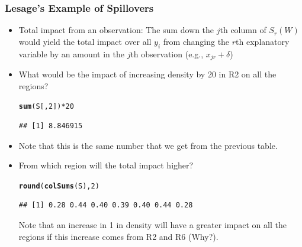 \documentclass[english,10pt]{beamer}\usepackage[]{graphicx}\usepackage[]{xcolor}
\makeatletter
\newcommand{\hlnum}[1]{\textcolor[rgb]{0.686,0.059,0.569}{#1}}%
\newcommand{\hlopt}[1]{\textcolor[rgb]{0,0,0}{#1}}%
\newcommand{\hldef}[1]{\textcolor[rgb]{0.345,0.345,0.345}{#1}}%
\newcommand{\hlkwd}[1]{\textcolor[rgb]{0.737,0.353,0.396}{\textbf{#1}}}%
\newenvironment{kframe}{%
 \def\at@end@of@kframe{}%
 \ifinner\ifhmode%
  \def\at@end@of@kframe{\end{minipage}}%
  \begin{minipage}{\columnwidth}%
 \fi\fi%
 \def\FrameCommand##1{\hskip\@totalleftmargin \hskip-\fboxsep
 \colorbox{shadecolor}{##1}\hskip-\fboxsep
     \hskip-\linewidth \hskip-\@totalleftmargin \hskip\columnwidth}%
 \MakeFramed {\advance\hsize-\width
   \@totalleftmargin\z@ \linewidth\hsize
   \@setminipage}}%
 {\par\unskip\endMakeFramed%
 \at@end@of@kframe}
\newenvironment{knitrout}{}{} %
\makeatother
\begin{document}
\begin{frame}[fragile]
  \frametitle{Lesage's Example of Spillovers}
    \begin{itemize}
      \item \alert{Total impact from an observation}: The sum down the $j$th column of $S_r(W)$ would yield the total impact over all $y_i$ from changing the $r$th explanatory variable by an amount in the $j$th observation (e.g., $x_{jr} + \delta$)
      \item What would be the impact of increasing density by 20 in R2 on all the regions?
\begin{knitrout}
\color{fgcolor}\begin{kframe}
\begin{alltt}
 \hlkwd{sum}\hldef{(S[,} \hlnum{2}\hldef{])} \hlopt{*} \hlnum{20}
\end{alltt}
\begin{verbatim}
## [1] 8.846915
\end{verbatim}
\end{kframe}
\end{knitrout}
   
   \item Note that this is the same number that we get from the previous table.
   \item From which region will the total impact higher?
   
\begin{knitrout}
\color{fgcolor}\begin{kframe}
\begin{alltt}
\hlkwd{round}\hldef{(}\hlkwd{colSums}\hldef{(S),} \hlnum{2}\hldef{)}
\end{alltt}
\begin{verbatim}
## [1] 0.28 0.44 0.40 0.39 0.40 0.44 0.28
\end{verbatim}
\end{kframe}
\end{knitrout}
   
   Note that an increase in 1 in density will have a greater impact on all the regions if this increase comes from R2 and R6 (Why?).
   
   \end{itemize}   
   
\end{frame}
\end{document}
